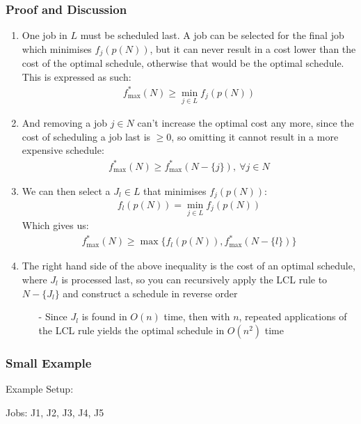 \documentclass[fleqn]{article}
\begin{document}
  \subsubsection*{Proof and Discussion}
  \begin{enumerate}
    \item One job in $L$ must be scheduled last. A job can be
    selected for the final job which minimises $f_j(p(N))$, but it can never result in a cost lower than the cost of the optimal schedule, otherwise that would be the optimal schedule. This is expressed as such: \begin{align*}
      f^*_{\text{max}}(N) \ge \min_{j \in L}f_j (p(N))
    \end{align*}
    \item And removing a job $j \in N$ can't increase the optimal cost any more, since the cost of scheduling a job last is $\ge 0$, so omitting it cannot result in a more expensive schedule: \begin{align*}
      f^*_{\text{max}}(N) \ge f^*_{\text{max}}(N - \{ j \}), \ \forall j \in N
    \end{align*}
    \item We can then select a $J_l \in L$ that minimises $f_j(p(N))$: \begin{align*}
      f_l(p(N)) = \min_{j \in L}f_j(p(N))
    \end{align*}
    Which gives us: \begin{align*}
      f^*_{\text{max}}(N) \ge \max \{ f_l(p(N)), f_{\text{max}}^*(N - \{ l \}) \}
    \end{align*}
    \item The right hand side of the above inequality is the cost of an optimal schedule, where $J_l$ is processed last,
    so you can recursively apply the LCL rule to $N - \{ J_l \}$ and construct a schedule in reverse order
    \begin{itemize}
      \item[-] Since $J_l$ is found in $O(n)$ time, then with $n$, repeated applications of the LCL rule yields the optimal schedule in $O(n^2)$ time
    \end{itemize}
  \end{enumerate}
  
  \subsubsection*{Small Example}
  Example Setup:

    Jobs: J1, J2, J3, J4, J5
\end{document}
